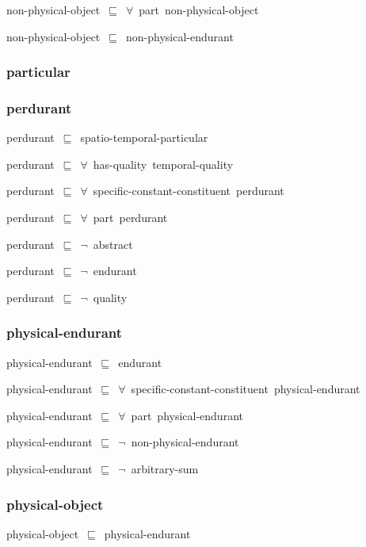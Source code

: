 \documentclass{article}
\begin{document}
non-physical-object~\ensuremath{\sqsubseteq}~\ensuremath{\forall}~part~non-physical-object~

non-physical-object~\ensuremath{\sqsubseteq}~non-physical-endurant~

\subsubsection*{particular}

\subsubsection*{perdurant}

perdurant~\ensuremath{\sqsubseteq}~spatio-temporal-particular~

perdurant~\ensuremath{\sqsubseteq}~\ensuremath{\forall}~has-quality~temporal-quality~

perdurant~\ensuremath{\sqsubseteq}~\ensuremath{\forall}~specific-constant-constituent~perdurant~

perdurant~\ensuremath{\sqsubseteq}~\ensuremath{\forall}~part~perdurant~

perdurant~\ensuremath{\sqsubseteq}~\ensuremath{\lnot}~abstract

perdurant~\ensuremath{\sqsubseteq}~\ensuremath{\lnot}~endurant

perdurant~\ensuremath{\sqsubseteq}~\ensuremath{\lnot}~quality

\subsubsection*{physical-endurant}

physical-endurant~\ensuremath{\sqsubseteq}~endurant~

physical-endurant~\ensuremath{\sqsubseteq}~\ensuremath{\forall}~specific-constant-constituent~physical-endurant~

physical-endurant~\ensuremath{\sqsubseteq}~\ensuremath{\forall}~part~physical-endurant~

physical-endurant~\ensuremath{\sqsubseteq}~\ensuremath{\lnot}~non-physical-endurant

physical-endurant~\ensuremath{\sqsubseteq}~\ensuremath{\lnot}~arbitrary-sum

\subsubsection*{physical-object}

physical-object~\ensuremath{\sqsubseteq}~physical-endurant~
\end{document}
